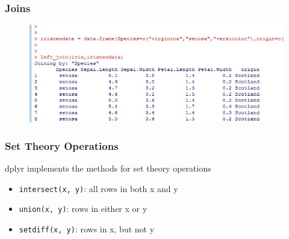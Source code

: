\documentclass{beamer}
\begin{document}
\begin{frame}
	\frametitle{Joins}
	\begin{figure}
		\centering
		\includegraphics[width=0.97\linewidth]{images/irisjoin}
		
		\label{fig:irisjoin}
	\end{figure}
	
\end{frame}

\begin{frame}
	\frametitle{Set Theory Operations}
	
	dplyr implements the methods for set theory operations
	
	\begin{itemize}
		\item \texttt{intersect(x, y)}: all rows in both x and y
		\item \texttt{union(x, y)}: rows in either x or y
		\item \texttt{setdiff(x, y)}: rows in x, but not y
	\end{itemize}
\end{frame}
\end{document}
